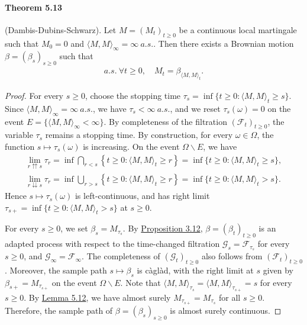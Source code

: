 \documentclass{article}
\numberwithin{equation}{section}
\theoremstyle{plain}
\theoremstyle{definition}
\begin{document}
\paragraph{Theorem 5.13\label{thm:5.13}} (Dambis-Dubins-Schwarz). Let $M=(M_t)_{t\geq 0}$ be a continuous local martingale such that $M_0=0$ and $\langle M,M\rangle_\infty=\infty\ a.s.$. Then there exists a Brownian motion $\beta=(\beta_s)_{s\geq 0}$ such that
\begin{align*}
	a.s.\ \forall t\geq 0,\quad M_t = \beta_{\langle M,M\rangle_t}.
\end{align*}
\begin{proof}
For every $s\geq 0$, choose the stopping time $\tau_s=\inf\{t\geq 0:\langle M,M\rangle_t\geq s\}$. Since $\langle M,M\rangle_\infty=\infty\ a.s.$, we have $\tau_s<\infty\ a.s.$, and we reset $\tau_s(\omega)=0$ on the event $E=\{\langle M,M\rangle_\infty<\infty\}$. By completeness of the filtration $(\mathscr{F}_t)_{t\geq 0}$, the variable $\tau_s$ remains a stopping time. By construction, for every $\omega\in\Omega$, the function $s\mapsto\tau_s(\omega)$ is increasing. On the event $\Omega\backslash E$, we have
\begin{align*}
	\lim_{r\upuparrows s}\tau_r = \inf\bigcap_{r<s}\left\{t\geq 0:\langle M,M\rangle_t\geq r\right\} = \inf\{t\geq 0:\langle M,M\rangle_t\geq s\},\\
	\lim_{r\downdownarrows s}\tau_r = \inf\bigcup_{r>s}\left\{t\geq 0:\langle M,M\rangle_t\geq r\right\} = \inf\{t\geq 0:\langle M,M\rangle_t > s\}.
\end{align*}
Hence $s\mapsto\tau_s(\omega)$ is left-continuous, and has right limit $\tau_{s+}=\inf\{t\geq 0:\langle M,M\rangle_t>s\}$ at $s\geq 0$.

For every $s\geq 0$, we set $\beta_s=M_{\tau_s}$. By \hyperref[prop:3.12]{Proposition 3.12}, $\beta=(\beta_t)_{t\geq 0}$ is an adapted process with respect to the time-changed filtration $\mathscr{G}_s=\mathscr{F}_{\tau_s}$ for every $s\geq 0$, and $\mathscr{G}_\infty=\mathscr{F}_\infty$. The completeness of $(\mathscr{G}_t)_{t\geq 0}$ also follows from $(\mathscr{F}_t)_{t\geq 0}$. Moreover, the sample path $s\mapsto\beta_s$ is càglàd, with the right limit at $s$ given by $\beta_{s+}=M_{\tau_{s+}}$ on the event $\Omega\backslash E$. Note that $\langle M,M\rangle_{\tau_s}=\langle M,M\rangle_{\tau_{s+}}=s$ for every $s\geq 0$. By \hyperref[lemma:5.12]{Lemma 5.12}, we have almost surely $M_{\tau_{s+}}=M_{\tau_s}$ for all $s\geq 0$. Therefore, the sample path of $\beta=(\beta_s)_{s\geq 0}$ is almost surely continuous.


\end{proof}
\end{document}
